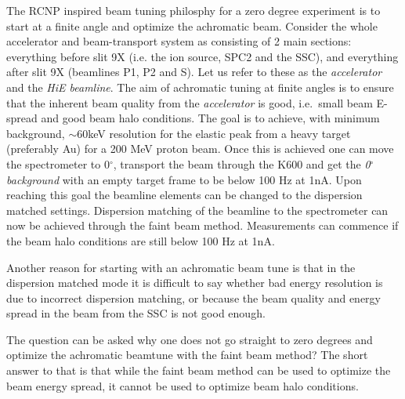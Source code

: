 \documentclass[11pt]{report}
\begin{document}
The RCNP inspired beam tuning philosphy for a zero degree experiment
is to start at a finite angle and optimize the achromatic beam. 
Consider the whole accelerator and beam-transport 
system as consisting of 2 main sections: everything before slit 9X 
(i.e. the ion source, SPC2 and the SSC), 
and everything after slit 9X (beamlines P1, P2 and S). Let us refer to these as 
the {\it accelerator} and the {\it HiE beamline}.
The aim of achromatic tuning at finite angles is to ensure that 
the inherent beam quality from the {\it accelerator} is good, i.e.~small 
beam E-spread and good beam halo conditions.
The goal is to achieve, with minimum background, 
$\sim$60keV resolution for the elastic peak from a heavy target (preferably Au) for a 200 MeV proton beam.
Once this is achieved one can move the spectrometer to 0$^{\circ}$, transport the beam through the K600
and get the {\it 0$^{\circ}$ background} with an empty target frame to be below 100 Hz at 1nA.
Upon reaching this goal the beamline elements can be changed to the dispersion 
matched settings. Dispersion matching of the beamline to the spectrometer
can now be achieved through the faint beam method. Measurements can commence 
if the beam halo conditions are still below 100 Hz at 1nA. 

Another reason for starting with an achromatic beam tune is that 
in the dispersion matched mode it is difficult to say whether bad energy resolution
is due to incorrect dispersion matching, or because the beam quality and energy spread in the beam
from the SSC is not good enough.


The question can be asked why one does not go straight to zero
degrees and optimize the achromatic beamtune with the faint beam method?  
The short answer to that is that while
the faint beam method can be used to optimize the beam energy spread, 
it cannot be used to optimize beam halo conditions. 
\end{document}
